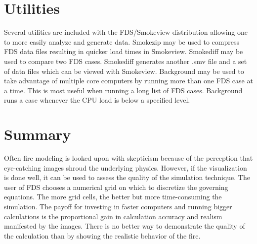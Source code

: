\documentclass[11pt,twoside]{book}
\begin{document}
\chapter{Utilities}
Several utilities are included with the FDS/Smokeview distribution allowing one
to more easily analyze and generate data.  Smokezip may be used to compress
FDS data files resulting in quicker load times in Smokeview.  Smokediff may be used
to compare two FDS cases.  Smokediff generates another .smv file and a set of data files
which can be viewed with Smokeview.  Background may be used to take advantage of multiple
core computers by running more than one FDS case at a time.  This is most useful when running
a long list of FDS cases. Background runs a case whenever the CPU load is below a specified level.














%


\chapter{Summary}
Often fire modeling is looked upon with skepticism because of the
perception that eye-catching images shroud the underlying physics.
However, if the visualization is done well, it can be used to
assess the quality of the simulation technique. The user of FDS
chooses a numerical grid on which to discretize the governing
equations. The more grid cells, the better but more time-consuming
the simulation. The payoff for investing in faster computers and
running bigger calculations is the proportional gain in calculation accuracy and realism
manifested by the images. There is no better way to demonstrate
the quality of the calculation than by showing the realistic
behavior of the fire.
\end{document}
